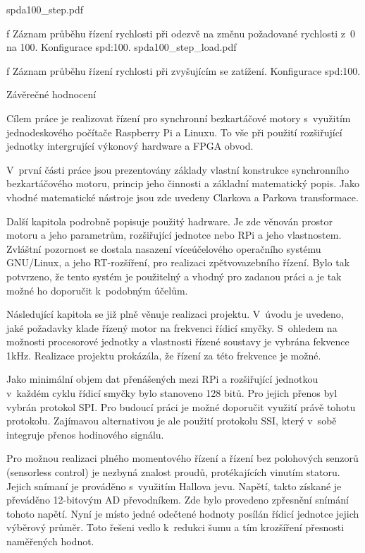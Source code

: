  \medskip {}
\picw=14.5cm \cinspic spda100_step.pdf
\caption/f Záznam průběhu řízení rychlosti při odezvě na změnu požadované rychlosti z~0 na 100. Konfigurace spd:100.
\medskip 
 \medskip {}
\picw=14.5cm \cinspic spda100_step_load.pdf
\caption/f Záznam průběhu řízení rychlosti při zvyšujícím se zatížení. Konfigurace spd:100.
\medskip 
 

\sec Závěrečné hodnocení
 
Cílem  práce  je  realizovat řízení pro  synchronní bezkartáčové motory s~využitím jednodeskového počítače Raspberry Pi a Linuxu. To vše při použití rozšiřující jednotky intergrující výkonový hardware a FPGA obvod.
  
  V~první  části  práce  jsou  prezentovány  základy  vlastní konstrukce synchronního  bezkartáčového motoru,  princip  jeho  činnosti  a základní matematický popis. Jako vhodné matematické  nástroje jsou zde uvedeny Clarkova a Parkova transformace.
  
  Další kapitola podrobně popisuje použitý hadrware. Je zde věnován prostor motoru a jeho parametrům, rozšiřující jednotce nebo RPi a jeho vlastnostem. Zvláštní pozornost se dostala nasazení víceúčelového operačního systému GNU/Linux, a jeho RT-rozšíření, pro realizaci zpětvovazebního řízení. Bylo tak potvrzeno, že tento systém je použitelný a vhodný pro zadanou práci a je tak možné ho doporučit k~podobným účelům. 
  
  Následující kapitola se již plně věnuje realizaci projektu. V~úvodu je uvedeno, jaké požadavky klade řízený motor na frekvenci řídicí smyčky. S~ohledem na možnosti procesorové jednotky a vlastnosti řízené soustavy je vybrána fekvence 1kHz. Realizace projektu prokázála, že řízení za této frekvence je možné. 
  
  Jako minimální objem dat přenášených mezi RPi a rozšiřující jednotkou v~každém cyklu řídicí smyčky bylo stanoveno 128 bitů. Pro jejich přenos byl vybrán protokol SPI. Pro budoucí práci je možné doporučit využití právě tohotu protokolu. Zajímavou alternativou je ale použití protokolu SSI, který v~sobě integruje přenos hodinového signálu.
  
  Pro možnou realizaci plného momentového řízení a řízení bez polohových senzorů (sensorless control) je nezbyná znalost proudů, protékajících vinutím statoru. Jejich snímaní je prováděno s~využitím Hallova jevu. Napětí, takto získané je převáděno 12-bitovým AD převodníkem. Zde bylo provedeno zpřesnění snímání tohoto napětí. Nyní je místo jedné odečtené hodnoty posílán řídicí jednotce jejich výběrový průměr. Toto řešeni vedlo k~redukci šumu a tím krozšíření přesnosti naměřených hodnot.
  
